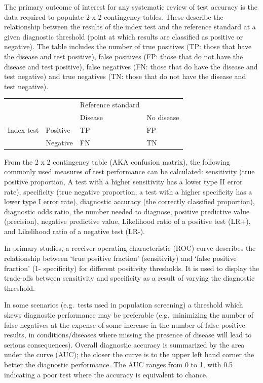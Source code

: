 \documentclass[
  11pt,
  a4paper,
  DIV=11,
  numbers=noendperiod]{scrreprt}
\begin{document}
The primary outcome of interest for any systematic review of test
accuracy is the data required to populate 2 x 2 contingency tables.
These describe the relationship between the results of the index test
and the reference standard at a given diagnostic threshold (point at
which results are classified as positive or negative). The table
includes the number of true positives (TP: those that have the disease
and test positive), false positives (FP: those that do not have the
disease and test positive), false negatives (FN: those that do have the
disease and test negative) and true negatives (TN: those that do not
have the disease and test negative).

\begin{longtable}[]{@{}llll@{}}
\toprule\noalign{}
\endhead
\bottomrule\noalign{}
\endlastfoot
& & Reference standard & \\
& & Disease & No disease \\
Index test & Positive & TP & FP \\
& Negative & FN & TN \\
\end{longtable}

From the 2 x 2 contingency table (AKA confusion matrix), the following
commonly used measures of test performance can be calculated:
sensitivity (true positive proportion, A test with a higher sensitivity
has a lower type II error rate), specificity (true negative proportion,
a test with a higher specificity has a lower type I error rate),
diagnostic accuracy (the correctly classified proportion), diagnostic
odds ratio, the number needed to diagnose, positive predictive value
(precision), negative predictive value, Likelihood ratio of a positive
test (LR+), and Likelihood ratio of a negative test (LR-).

In primary studies, a receiver operating characteristic (ROC) curve
describes the relationship between `true positive fraction'
(sensitivity) and `false positive fraction' (1- specificity) for
different positivity thresholds. It is used to display the trade-offs
between sensitivity and specificity as a result of varying the
diagnostic threshold.

In some scenarios (e.g.~tests used in population screening) a threshold
which skews diagnostic performance may be preferable (e.g.~minimizing
the number of false negatives at the expense of some increase in the
number of false positive results, in conditions/diseases where missing
the presence of disease will lead to serious consequences). Overall
diagnostic accuracy is summarized by the area under the curve (AUC); the
closer the curve is to the upper left hand corner the better the
diagnostic performance. The AUC ranges from 0 to 1, with 0.5 indicating
a poor test where the accuracy is equivalent to chance.
\end{document}
